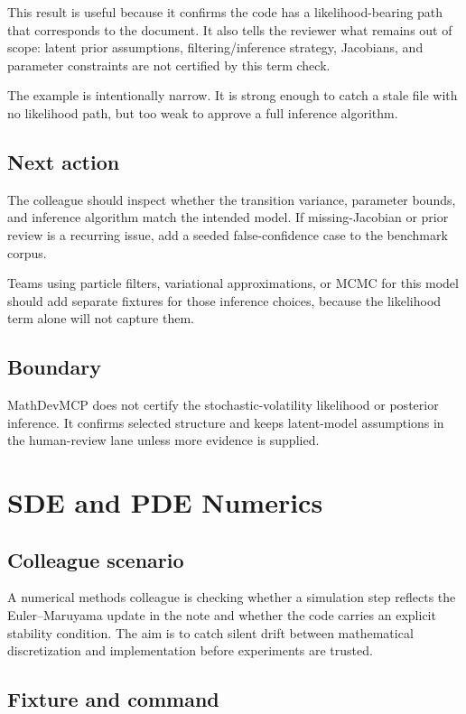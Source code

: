\documentclass[12pt,a4paper,openany]{book}
\begin{document}
This result is useful because it confirms the code has a likelihood-bearing path
that corresponds to the document. It also tells the reviewer what remains out of
scope: latent prior assumptions, filtering/inference strategy, Jacobians, and
parameter constraints are not certified by this term check.

The example is intentionally narrow. It is strong enough to catch a stale file
with no likelihood path, but too weak to approve a full inference algorithm.

\section*{Next action}

The colleague should inspect whether the transition variance, parameter bounds,
and inference algorithm match the intended model. If missing-Jacobian or prior
review is a recurring issue, add a seeded false-confidence case to the benchmark
corpus.

Teams using particle filters, variational approximations, or MCMC for this
model should add separate fixtures for those inference choices, because the
likelihood term alone will not capture them.

\section*{Boundary}

MathDevMCP does not certify the stochastic-volatility likelihood or posterior
inference. It confirms selected structure and keeps latent-model assumptions in
the human-review lane unless more evidence is supplied.

\chapter{SDE and PDE Numerics}

\section*{Colleague scenario}

A numerical methods colleague is checking whether a simulation step reflects the
Euler--Maruyama update in the note and whether the code carries an explicit
stability condition. The aim is to catch silent drift between mathematical
discretization and implementation before experiments are trusted.

\section*{Fixture and command}
\end{document}
